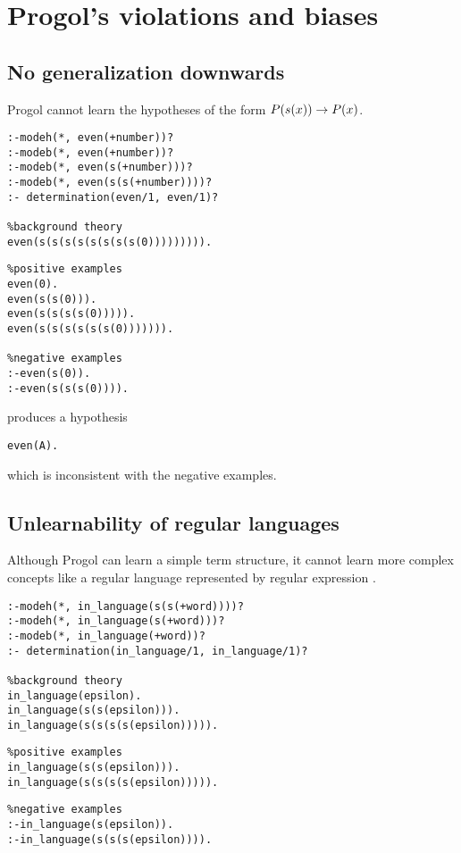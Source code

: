 \section{Progol's violations and biases}
\subsection{No generalization downwards}
Progol cannot learn the hypotheses of the form $P(s(x)) \to P(x)$.

\begin{minipage}[t]{.60\textwidth}
\begin{lstlisting}
:-modeh(*, even(+number))?
:-modeb(*, even(+number))?
:-modeb(*, even(s(+number)))?
:-modeb(*, even(s(s(+number))))?
:- determination(even/1, even/1)?

%background theory
even(s(s(s(s(s(s(s(s(0))))))))).
\end{lstlisting}
\end{minipage}
\begin{minipage}[t]{.20\textwidth}
\begin{lstlisting}
%positive examples
even(0).
even(s(s(0))).
even(s(s(s(s(0))))).
even(s(s(s(s(s(s(0))))))).

%negative examples
:-even(s(0)).
:-even(s(s(s(0)))).
\end{lstlisting}
\end{minipage}

produces a hypothesis
\begin{lstlisting}
even(A).
\end{lstlisting}
which is inconsistent with the negative examples.

\subsection{Unlearnability of regular languages}
Although Progol can learn a simple term structure, it cannot learn more complex concepts like a regular language represented by regular expression .

\begin{lstlisting}
:-modeh(*, in_language(s(s(+word))))?
:-modeh(*, in_language(s(+word)))?
:-modeb(*, in_language(+word))?
:- determination(in_language/1, in_language/1)?

%background theory
in_language(epsilon).
in_language(s(s(epsilon))).
in_language(s(s(s(s(epsilon))))).
\end{lstlisting}

\begin{minipage}[t]{.50\textwidth}
\begin{lstlisting}
%positive examples
in_language(s(s(epsilon))).
in_language(s(s(s(s(epsilon))))).
\end{lstlisting}
\end{minipage}
\begin{minipage}[t]{.20\textwidth}
\begin{lstlisting}
%negative examples
:-in_language(s(epsilon)).
:-in_language(s(s(s(epsilon)))).
\end{lstlisting}
\end{minipage}

